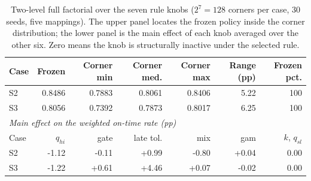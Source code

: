 \begin{table}[H]
\centering
\caption{Two-level full factorial over the seven rule knobs ($2^7=128$ corners per case, 30 seeds, five mappings). The upper panel locates the frozen policy inside the corner distribution; the lower panel is the main effect of each knob averaged over the other six. Zero means the knob is structurally inactive under the selected rule.}
\label{tab:p3-factorial}
\scriptsize
\begin{tabular}{lrrrrrr}
\toprule
Case & Frozen & Corner min & Corner med. & Corner max & Range (pp) & Frozen pct. \\
\midrule
S2 & 0.8486 & 0.7883 & 0.8061 & 0.8406 & 5.22 & 100 \\
S3 & 0.8056 & 0.7392 & 0.7873 & 0.8017 & 6.25 & 100 \\
\midrule
\multicolumn{7}{l}{\emph{Main effect on the weighted on-time rate (pp)}}\\
Case & $q_{hi}$ & gate & late tol. & mix & gam & $k$, $q_{sl}$ \\
\midrule
S2 & -1.12 & -0.11 & +0.99 & -0.80 & +0.04 & 0.00 \\
S3 & -1.22 & +0.61 & +4.46 & +0.07 & -0.02 & 0.00 \\
\bottomrule
\end{tabular}
\end{table}
